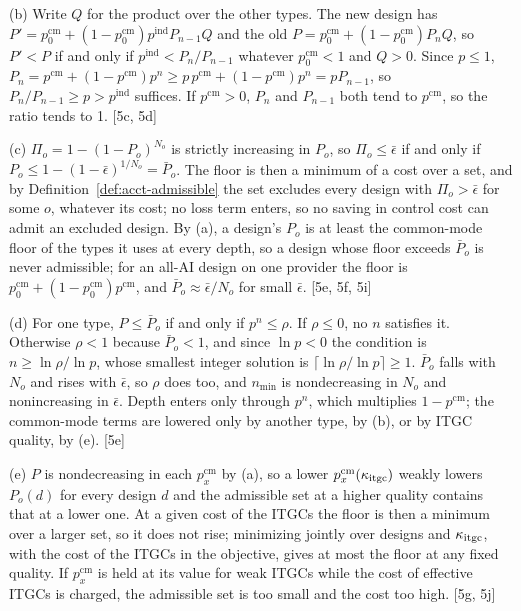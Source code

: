 (b) Write $Q$ for the product over the other types. The new design has $P'=p^{\mathrm{cm}}_0+(1-p^{\mathrm{cm}}_0)p^{\mathrm{ind}}P_{n-1}Q$ and the old $P=p^{\mathrm{cm}}_0+(1-p^{\mathrm{cm}}_0)P_nQ$, so $P'<P$ if and only if $p^{\mathrm{ind}}<P_n/P_{n-1}$ whatever $p^{\mathrm{cm}}_0<1$ and $Q>0$. Since $p\le 1$, $P_n=p^{\mathrm{cm}}+(1-p^{\mathrm{cm}})p^n\ge p\,p^{\mathrm{cm}}+(1-p^{\mathrm{cm}})p^n=pP_{n-1}$, so $P_n/P_{n-1}\ge p>p^{\mathrm{ind}}$ suffices. If $p^{\mathrm{cm}}>0$, $P_n$ and $P_{n-1}$ both tend to $p^{\mathrm{cm}}$, so the ratio tends to 1. [5c, 5d]

(c) $\Pi_o=1-(1-P_o)^{N_o}$ is strictly increasing in $P_o$, so $\Pi_o\le\bar\epsilon$ if and only if $P_o\le1-(1-\bar\epsilon)^{1/N_o}=\bar P_o$. The floor is then a minimum of a cost over a set, and by Definition~\ref{def:acct-admissible} the set excludes every design with $\Pi_o>\bar\epsilon$ for some $o$, whatever its cost; no loss term enters, so no saving in control cost can admit an excluded design. By (a), a design's $P_o$ is at least the common-mode floor of the types it uses at every depth, so a design whose floor exceeds $\bar P_o$ is never admissible; for an all-AI design on one provider the floor is $p^{\mathrm{cm}}_0+(1-p^{\mathrm{cm}}_0)p^{\mathrm{cm}}$, and $\bar P_o\approx\bar\epsilon/N_o$ for small $\bar\epsilon$. [5e, 5f, 5i]

(d) For one type, $P\le\bar P_o$ if and only if $p^n\le\rho$. If $\rho\le0$, no $n$ satisfies it. Otherwise $\rho<1$ because $\bar P_o<1$, and since $\ln p<0$ the condition is $n\ge\ln\rho/\ln p$, whose smallest integer solution is $\lceil\ln\rho/\ln p\rceil\ge1$. $\bar P_o$ falls with $N_o$ and rises with $\bar\epsilon$, so $\rho$ does too, and $n_{\min}$ is nondecreasing in $N_o$ and nonincreasing in $\bar\epsilon$. Depth enters only through $p^n$, which multiplies $1-p^{\mathrm{cm}}$; the common-mode terms are lowered only by another type, by (b), or by ITGC quality, by (e). [5e]

(e) $P$ is nondecreasing in each $p^{\mathrm{cm}}_x$ by (a), so a lower $p^{\mathrm{cm}}_x(\kappa_{\rm itgc})$ weakly lowers $P_o(d)$ for every design $d$ and the admissible set at a higher quality contains that at a lower one. At a given cost of the ITGCs the floor is then a minimum over a larger set, so it does not rise; minimizing jointly over designs and $\kappa_{\rm itgc}$, with the cost of the ITGCs in the objective, gives at most the floor at any fixed quality. If $p^{\mathrm{cm}}_x$ is held at its value for weak ITGCs while the cost of effective ITGCs is charged, the admissible set is too small and the cost too high. [5g, 5j]

